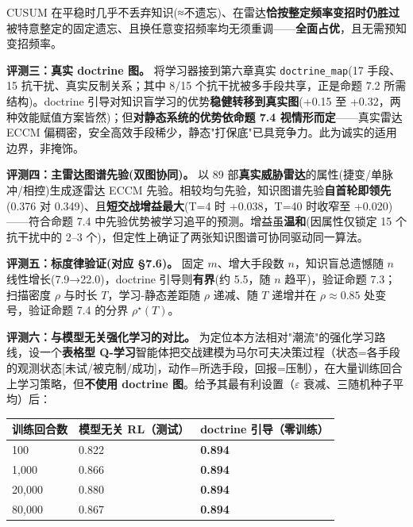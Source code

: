 \documentclass[12pt,a4paper]{ctexart}
\begin{document}
CUSUM 在平稳时几乎不丢弃知识(≈不遗忘)、在雷达\textbf{恰按整定频率变招时仍胜过}被特意整定的固定遗忘、且换任意变招频率均无须重调——\textbf{全面占优}，且无需预知变招频率。

\textbf{评测三：真实 doctrine 图。} 将学习器接到第六章真实 \texttt{doctrine\_map}(17 手段、15 抗干扰、真实反制关系；其中 8/15 个抗干扰被多手段共享，正是命题 7.2 所需结构)。doctrine 引导对知识盲学习的优势\textbf{稳健转移到真实图}(+0.15 至 +0.32，两种效能赋值方案皆然)；但\textbf{对静态系统的优势依命题 7.4 视情形而定}——真实雷达 ECCM 偏稠密，安全高效手段稀少，静态"打保底"已具竞争力。此为诚实的适用边界，非掩饰。

\textbf{评测四：主雷达图谱先验(双图协同)。} 以 89 部\textbf{真实威胁雷达}的属性(捷变/单脉冲/相控)生成逐雷达 ECCM 先验。相较均匀先验，知识图谱先验\textbf{自首轮即领先}(0.376 对 0.349)、且\textbf{短交战增益最大}(T=4 时 +0.038，T=40 时收窄至 +0.020)——符合命题 7.4 中先验优势被学习追平的预测。增益虽\textbf{温和}(因属性仅锁定 15 个抗干扰中的 2–3 个)，但定性上确证了两张知识图谱可协同驱动同一算法。

\textbf{评测五：标度律验证(对应 §7.6)。} 固定 $m$、增大手段数 $n$，知识盲总遗憾随 $n$ 线性增长(7.9→22.0)，doctrine 引导则\textbf{有界}(约 5.5，随 $n$ 趋平)，验证命题 7.3；扫描密度 $\rho$ 与时长 $T$，学习-静态差距随 $\rho$ 递减、随 $T$ 递增并在 $\rho\!\approx\!0.85$ 处变号，验证命题 7.4 的分界 $\rho^\star(T)$。

\textbf{评测六：与模型无关强化学习的对比。} 为定位本方法相对"潮流"的强化学习路线，设一个\textbf{表格型 Q-学习}智能体把交战建模为马尔可夫决策过程（状态=各手段的观测状态[未试/被克制/成功]，动作=所选手段，回报=压制），在大量训练回合上学习策略，但\textbf{不使用 doctrine 图}。给予其最有利设置（$\varepsilon$ 衰减、三随机种子平均）后：

\begin{center}\small
\begin{tabular}{|p{}|p{}|p{}|}
\hline
\textbf{训练回合数} & \textbf{模型无关 RL（测试）} & \textbf{doctrine 引导（零训练）} \\ \hline
100 & 0.822 & \textbf{0.894} \\ \hline
1,000 & 0.866 & \textbf{0.894} \\ \hline
20,000 & 0.880 & \textbf{0.894} \\ \hline
80,000 & 0.867 & \textbf{0.894} \\ \hline
\end{tabular}
\end{center}
\end{document}

